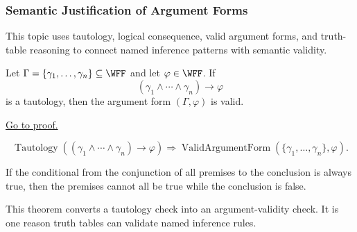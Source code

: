 \subsubsection*{Semantic Justification of Argument Forms}

\begin{remark*}
This topic uses tautology, logical consequence, valid argument forms, and
truth-table reasoning to connect named inference patterns with semantic
validity.
\end{remark*}

\begin{tcolorbox}[colback=thmbox, colframe=thmborder, arc=2pt,
  left=6pt, right=6pt, top=4pt, bottom=4pt,
  title={\small\textbf{Theorem (Tautological Implication Gives a Valid Argument Form)}},
  fonttitle=\small\bfseries]
\begin{theorem}
\label{thm:tautological-implication-valid-argument-form-propositional-logic}
Let \(\Gamma=\{\gamma_1,\ldots,\gamma_n\}\subseteq\WFF\) and let
\(\varphi\in\WFF\). If
\[
(\gamma_1\land\cdots\land\gamma_n)\to\varphi
\]
is a tautology, then the argument form \((\Gamma,\varphi)\) is valid.

\noindent\hyperref[prf:tautological-implication-valid-argument-form-propositional-logic]{Go to proof.}
\end{theorem}
\end{tcolorbox}

\begin{remark*}
\[
\operatorname{Tautology}((\gamma_1\land\cdots\land\gamma_n)\to\varphi)
\Longrightarrow
\operatorname{ValidArgumentForm}(\{\gamma_1,
\ldots,\gamma_n\},\varphi).
\]
\end{remark*}

\begin{remark*}
If the conditional from the conjunction of all premises to the conclusion is
always true, then the premises cannot all be true while the conclusion is false.
\end{remark*}

\begin{remark*}[Interpretation]
This theorem converts a tautology check into an argument-validity check. It is
one reason truth tables can validate named inference rules.
\end{remark*}


